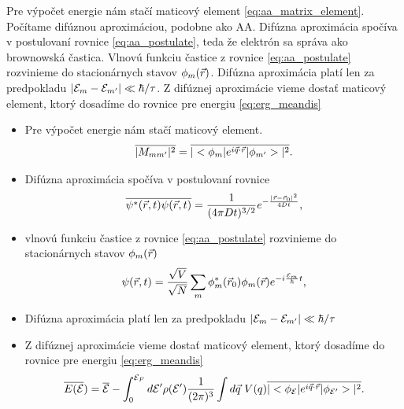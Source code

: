 \documentclass[
	11pt, %
]{beamer}
\begin{document}
\begin{frame}
\note
{
Pre výpočet energie nám stačí maticový element \eqref{eq:aa_matrix_element}. Počítame difúznou aproximáciou, podobne ako AA. 
 Difúzna aproximácia spočíva v postulovaní rovnice \eqref{eq:aa_postulate}, teda že elektrón sa správa ako brownowská častica.
  Vlnovú funkciu častice z rovnice \eqref{eq:aa_postulate} rozvinieme do stacionárnych stavov $\phi_m(\vec{r})$.
  Difúzna aproximácia platí len za predpokladu $|\mathcal{E}_m-\mathcal{E}_{m'}|\ll\hbar / \tau$. Z difúznej aproximácie vieme dostať maticový element, ktorý dosadíme  do rovnice pre energiu \eqref{eq:erg_meandis}
}

\begin{itemize}
\item Pre výpočet energie nám stačí maticový element.
\begin{equation}
\label{eq:aa_matrix_element}
\overline{| M_{mm'}|^2} =\overline{|<\phi_m|e^{i\vec{q}\cdot\vec{r}}|\phi_{m'}>|^2} \text{.}
\end{equation}
\item Difúzna aproximácia spočíva v postulovaní rovnice
\begin{equation}
 \label{eq:aa_postulate}
 \overline{\psi^*(\vec{r},t)\psi(\vec{r},t)}=\frac{1}{(4\pi Dt)^{3/2}}e^{-\frac{|\vec{r}-\vec{r}_0|^2}{4Dt}} \text{,}
\end{equation}
\item vlnovú funkciu častice z rovnice \eqref{eq:aa_postulate} rozvinieme do stacionárnych stavov $\phi_m(\vec{r})$
\begin{equation}
 \label{eq:aa_psi_sum}
 \psi(\vec{r},t)=\frac{\sqrt{V}}{\sqrt{N}}\sum_m \phi_m^*(\vec{r}_0)\phi_m(\vec{r})e^{-i\frac{\mathcal{E}_m}{\hbar}t} \text{,}
\end{equation}
\item Difúzna aproximácia platí len za predpokladu $|\mathcal{E}_m-\mathcal{E}_{m'}|\ll\hbar / \tau$
\item Z difúznej aproximácie vieme dostať maticový element, ktorý dosadíme  do rovnice pre energiu \eqref{eq:erg_meandis}
\begin{equation}
\label{eq:erg_meandis modif}
 \overline{E(\mathcal{E}})=\overline{\mathcal{E}}-\int_{0}^{\mathcal{E}_F} d\mathcal{E}' \rho(\mathcal{E}') \frac{1}{(2\pi)^{3}} \int d\vec{q}\ V(q) \overline{|<\phi_{\mathcal{E}}|e^{i\vec{q}\cdot\vec{r}}|\phi_{\mathcal{E}'}>|^2} \text{.}
\end{equation}
\end{itemize}
\end{frame}
\end{document}
